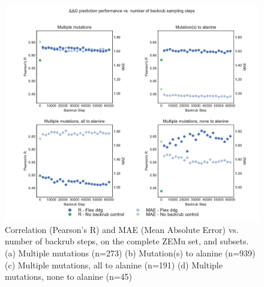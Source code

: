 \begin{figure}
  \includegraphics[width=\textwidth,keepaspectratio]{steps-v-corr_mult.pdf}
  \caption[Flex ddG performance vs. number of backrub steps]{
    Correlation (Pearson's R) and MAE (Mean Absolute Error) vs. number of backrub steps, on the complete ZEMu set, and subsets.
    (a) Multiple mutations (n=273)
    (b) Mutation(s) to alanine (n=939)
    (c) Multiple mutations, all to alanine (n=191)
    (d) Multiple mutations, none to alanine (n=45)
  } \label{fig:steps-v-corr_mult}
\end{figure}
